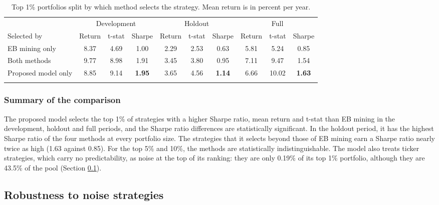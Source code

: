 \documentclass[pdflatex,sn-mathphys-num]{sn-jnl}%
\theoremstyle{thmstyleone}%
\theoremstyle{thmstyletwo}%
\theoremstyle{thmstylethree}%
\begin{document}
\begin{table}[h]
\caption{Top 1\% portfolios split by which method selects the strategy. Mean return is in percent per year.}\label{tab:disagree}%
\small
\begin{tabular}{@{}lccccccccc@{}}
\toprule
 & \multicolumn{3}{c}{Development} & \multicolumn{3}{c}{Holdout} & \multicolumn{3}{c}{Full} \\
\cmidrule(lr){2-4}\cmidrule(lr){5-7}\cmidrule(lr){8-10}
Selected by & Return & t-stat & Sharpe & Return & t-stat & Sharpe & Return & t-stat & Sharpe \\
\midrule
EB mining only & 8.37 & 4.69 & 1.00 & 2.29 & 2.53 & 0.63 & 5.81 & 5.24 & 0.85 \\
Both methods & 9.77 & 8.98 & 1.91 & 3.45 & 3.80 & 0.95 & 7.11 & 9.47 & 1.54 \\
Proposed model only & 8.85 & 9.14 & \textbf{1.95} & 3.65 & 4.56 & \textbf{1.14} & 6.66 & 10.02 & \textbf{1.63} \\
\botrule
\end{tabular}
\end{table}

\subsubsection{Summary of the comparison}
The proposed model selects the top 1\% of strategies with a higher Sharpe ratio, mean return and t-stat than EB mining in the development, holdout and full periods, and the Sharpe ratio differences are statistically significant. In the holdout period, it has the highest Sharpe ratio of the four methods at every portfolio size. The strategies that it selects beyond those of EB mining earn a Sharpe ratio nearly twice as high (1.63 against 0.85). For the top 5\% and 10\%, the methods are statistically indistinguishable. The model also treats ticker strategies, which carry no predictability, as noise at the top of its ranking: they are only 0.19\% of its top 1\% portfolio, although they are 43.5\% of the pool (Section \ref{subsec5_2}).

\subsection{Robustness to noise strategies}\label{subsec5_2}
\end{document}
